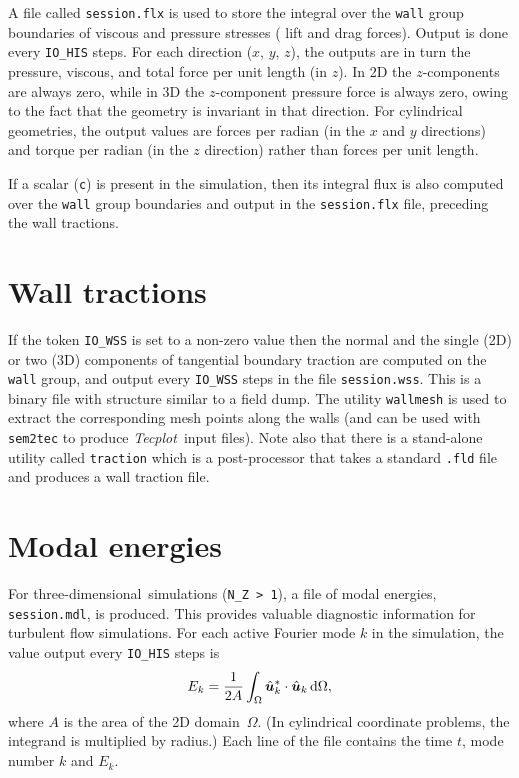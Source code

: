 \documentclass[11pt]{report}
\newcommand{\Tecplot}{\emph{Tecplot}}
\newcommand\threed{three-di\-men\-sion\-al}
\begin{document}
A file called \verb+session.flx+ is used to store the integral over
the \verb+wall+ group boundaries of viscous and pressure stresses (\ie
lift and drag forces).  Output is done every \verb+IO_HIS+ steps.  For
each direction ($x$, $y$, $z$), the outputs are in turn the pressure,
viscous, and total force per unit length (in $z$).  In 2D the
$z$-components are always zero, while in 3D the $z$-component pressure
force is always zero, owing to the fact that the geometry is invariant
in that direction.  For cylindrical geometries, the output values are
forces per radian (in the $x$ and $y$ directions) and torque per
radian (in the $z$ direction) rather than forces per unit length.

If a scalar (\verb+c+) is present in the simulation, then its integral
flux is also computed over the \verb+wall+ group boundaries and output
in the \verb+session.flx+ file, preceding the wall tractions.

\section{Wall tractions}
\label{sec.traction}

If the token \verb+IO_WSS+ is set to a non-zero value then the normal
and the single (2D) or two (3D) components of tangential boundary
traction are computed on the \verb+wall+ group, and output every
\verb+IO_WSS+ steps in the file \verb+session.wss+.  This is a binary
file with structure similar to a field dump.  The utility
\verb+wallmesh+ is used to extract the corresponding mesh points along
the walls (and can be used with \verb|sem2tec| to produce
\Tecplot\ input files). Note also that there is a stand-alone utility
called \verb+traction+ which is a post-processor that takes a standard
\verb|.fld| file and produces a wall traction file.

\section{Modal energies}
\label{sec.modal}

For \threed\ simulations (\verb+N_Z > 1+), a file of modal energies,
\verb+session.mdl+, is produced.  This provides valuable diagnostic
information for turbulent flow simulations.  For each active Fourier
mode $k$ in the simulation, the value output every \verb+IO_HIS+ steps
is 
\[
E_k =
\frac{1}{2A}\int_\Omega
\hat{\bm{u}}_k^\ast\cdot\hat{\bm{u}}_k \,{\rm d}\Omega,
\]
where $A$ is the area of the 2D domain~$\Omega$.  (In cylindrical
coordinate problems, the integrand is multiplied by radius.) Each line
of the file contains the time $t$, mode number $k$ and $E_k$.
\end{document}
